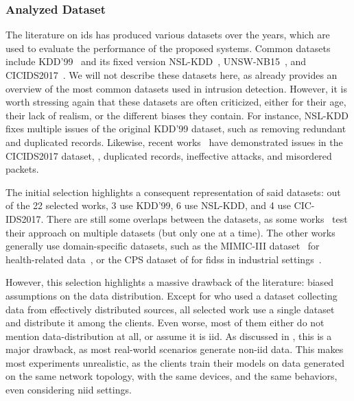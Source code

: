 \subsubsection{Analyzed Dataset\label{sec:sota.quali.dataset}}

The literature on \gls{ids} has produced various datasets over the years, which are used to evaluate the performance of the proposed systems.
Common datasets include KDD'99~\cite{kddcup99} and its fixed version NSL-KDD~\cite{tavallaee_detailedanalysisKDD_2009}, UNSW-NB15~\cite{moustafa_UNSWNB15comprehensivedata_2015}, and CICIDS2017~\cite{sharafaldin_GeneratingNewIntrusion_2018}.
We will not describe these datasets here, as  already provides an overview of the most common datasets used in intrusion detection.
However, it is worth stressing again that these datasets are often criticized, either for their age, their lack of realism, or the different biases they contain.
For instance, NSL-KDD fixes multiple issues of the original KDD'99 dataset, such as removing redundant and duplicated records.
Likewise, recent works~\cite{lanvin_ErrorsCICIDS2017dataset_2022,engelen_TroubleshootingIntrusionDetection_2021} have demonstrated issues in the CICIDS2017 dataset, \eg, duplicated records, ineffective attacks, and misordered packets.

The initial selection highlights a consequent representation of said datasets: out of the 22 selected works, 3 use KDD'99, 6 use NSL-KDD, and 4 use CIC-IDS2017.
There are still some overlaps between the datasets, as some works~\cite{zhao_MultiTaskNetworkAnomaly_2019,fan_IoTDefenderFederatedTransfer_2020,qin_LineSpeedScalableIntrusion_2020,chen_IntrusionDetectionWireless_2020} test their approach on multiple datasets (but only one at a time).
The other works generally use domain-specific datasets, such as the MIMIC-III dataset~\cite{johnson_MIMICIIIfreelyaccessible_2016} for health-related data~\cite{schneble_Attackdetectionusing_2019}, or the CPS dataset of \textcite{morris_IndustrialControlSystem_2014} for \glspl{fids} in industrial settings~\cite{li_DeepFedFederatedDeep_2020}.

However, this selection highlights a massive drawback of the literature: biased assumptions on the data distribution.
Except for  who used a dataset collecting data from effectively distributed sources, all selected work use a single dataset and distribute it among the clients.
Even worse, most of them either do not mention data-distribution at all, or assume it is \gls{iid}.
As discussed in , this is a major drawback, as most real-world scenarios generate non-\gls{iid} data.
This makes most experiments unrealistic, as the clients train their models on data generated on the same network topology, with the same devices, and the same behaviors, even considering \gls{niid} settings.

